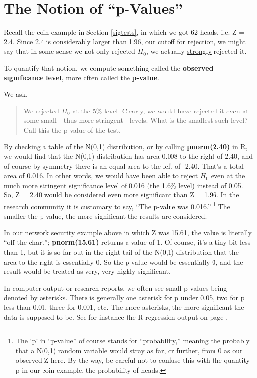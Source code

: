 \section{The Notion of ``p-Values''}

Recall the coin example in Section \ref{sigtests}, in which we got 62
heads, i.e. Z = 2.4.  Since 2.4 is considerably larger than 1.96, our
cutoff for rejection, we might say that in some sense we not only
rejected $H_0$, we actually \underline{strongly} rejected it.

To quantify that notion, we compute something called the {\bf observed
significance level}, more often called the {\bf p-value}. 

We ask,

\begin{quote}
We rejected $H_0$ at the 5\% level.  Clearly, we would have rejected it
even at some small---thus more stringent---levels.  What is the smallest
such level?  Call this the p-value of the test.
\end{quote}

By checking a table of the N(0,1) distribution, or by calling {\bf
pnorm(2.40)} in R, we would find that the N(0,1) distribution has area
0.008 to the right of 2.40, and of course by symmetry there is an equal
area to the left of -2.40.  That's a total area of 0.016.  In other
words, we would have been able to reject $H_0$ even at the much more
stringent significance level of 0.016 (the 1.6\% level) instead of 0.05.
So, Z = 2.40 would be considered even more significant than Z = 1.96.
In the research community it is customary to say, ``The p-value was
0.016.'' \footnote{The `p' in ``p-value'' of course stands for
``probability,'' meaning the probably that a N(0,1) random variable
would stray as far, or further, from 0 as our observed Z here.  By the
way, be careful not to confuse this with the quantity p in our coin
example, the probability of heads.}  The smaller the p-value, the more
significant the results are considered.  
 

In our network security example above in which Z was 15.61, the value is
literally ``off the chart''; {\bf pnorm(15.61)} returns a value of 1.
Of course, it's a tiny bit less than 1, but it is so far out in the
right tail of the N(0,1) distribution that the area to the right is
essentially 0.  So the p-value would be essentially 0, and the result
would be treated as very, very highly significant.

In computer output or research reports, we often see small p-values
being denoted by asterisks.  There is generally one asterisk for p under
0.05, two for p less than 0.01, three for 0.001, etc.  The more
asterisks, the more significant the data is supposed to be.  See for
instance the R regression output on page \pageref{asterisksexample}.

